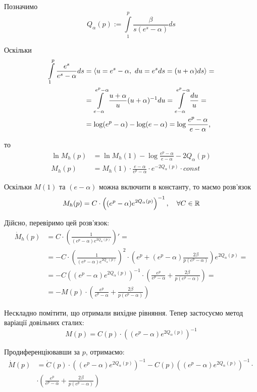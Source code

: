 Позначимо
\begin{equation}
	\label{eq:almost_li_alpha}
	Q_\alpha(p) := \int\limits_1^p \frac{\beta}{s(e^s - \alpha)} ds
\end{equation}

Оскільки
\begin{align*}
	\int\limits_1^p \frac{e^s}{e^s - \alpha} ds &= \langle u = e^s - \alpha,~ du = e^s ds = (u+\alpha) ds \rangle = \\
	&= \int\limits_{e-\alpha}^{e^p -\alpha} \frac{u + \alpha}{u} (u+\alpha)^{-1} du = 
	\int\limits_{e-\alpha}^{e^p -\alpha} \frac{du}{u} = \\
	&= \log(e^p - \alpha) - \log(e-\alpha) = \log \frac{e^p - \alpha}{e - \alpha} \text{,}
\end{align*}

то
\begin{align*}
	\ln{M_h (p)} &= \ln{M_h (1)} - \log \frac{e^p - \alpha}{e - \alpha} - 2Q_\alpha(p) \\
	M_h (p) &= M_h (1) \cdot \frac{e - \alpha}{e^p - \alpha} \cdot e^{- 2Q_\alpha(p)} \cdot const
\end{align*}

Оскільки $M(1)$ та $(e-\alpha)$ можна включити в константу, то маємо розв'язок
\begin{equation}
	\label{eq:uniform_right_laplace_homogen_sol}
	M_h (p) = C \cdot \left((e^p - \alpha)  e^{2Q_\alpha(p)}\right)^{-1}, \quad \forall C \in \mathbb{R}
\end{equation}

Дійсно, перевіримо цей розв'язок:
\[
\begin{split}
	\dot M_h (p) &= C \cdot \left(\frac{1}{(e^p - \alpha)  e^{2Q_\alpha(p)}}\right)'=\\
	 &= - C \cdot \left(\frac{1}{(e^p - \alpha)  e^{2Q_\alpha(p)}}\right)^2 \cdot \left(e^p  + (e^p - \alpha) \frac{2\beta}{p(e^p - \alpha)}   \right) e^{2Q_\alpha(p)} =\\
	 &= -C \left((e^p - \alpha)  e^{2Q_\alpha(p)}\right)^{-1} \cdot \left(\frac{e^p}{e^p - \alpha}  + \frac{2\beta}{p(e^p - \alpha)}   \right) =\\
	 &= - M(p) \cdot \left(\frac{e^p}{e^p - \alpha}  + \frac{2\beta}{p(e^p - \alpha)}   \right)
\end{split}
\]

Нескладно помітити, що отримали вихідне рівняння. Тепер застосуємо метод варіації довільних сталих:
$$
	M(p) = C(p) \cdot \left((e^p - \alpha)  e^{2Q_\alpha(p)}\right)^{-1} 
$$

Продиференціювавши за $p$, отримаємо:
\begin{align*}
	\dot M(p) &= \dot C(p) \cdot \left((e^p - \alpha)  e^{2Q_\alpha(p)}\right)^{-1} -C(p) \left((e^p - \alpha)  e^{2Q_\alpha(p)}\right)^{-1} \cdot \\
	&\cdot \left(\frac{e^p}{e^p - \alpha}  + \frac{2\beta}{p(e^p - \alpha)}   \right) 
\end{align*}

